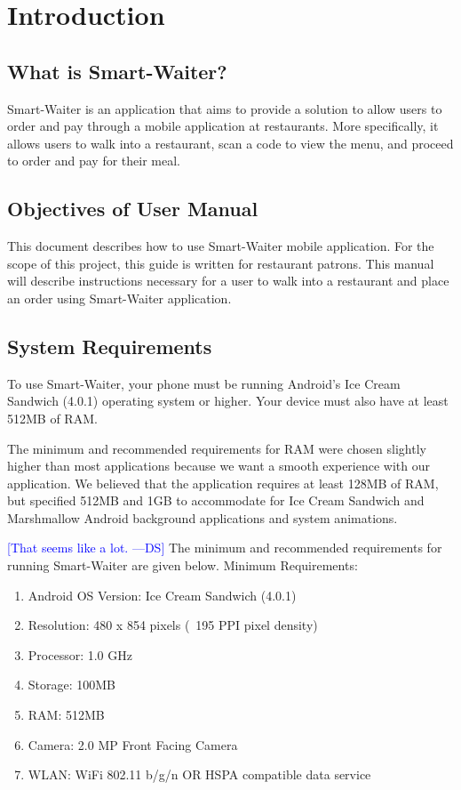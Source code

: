 \documentclass[12pt, titlepage]{article}
\newcommand{\authornote}[3]{\textcolor{#1}{[#3 ---#2]}}
\newcommand{\authornote}[3]{}
\newcommand{\ds}[1]{\authornote{blue}{DS}{#1}}
\begin{document}
\section{Introduction}

\subsection{What is Smart-Waiter?}
Smart-Waiter is an application that aims to provide a solution to allow users to order and pay through a mobile application at restaurants. More specifically, it allows users to walk into a restaurant, scan a code to view the menu, and proceed to order and pay for their meal.
\subsection{Objectives of User Manual}
This document describes how to use Smart-Waiter mobile application. For the scope of this project, this guide is written for restaurant patrons. This manual will describe instructions necessary for a user to walk into a restaurant and place an order using Smart-Waiter application. 

\subsection{System Requirements}
To use Smart-Waiter, your phone must be running Android's Ice Cream Sandwich (4.0.1) operating system or higher. Your device must also have at least 512MB of RAM. 

The minimum and recommended requirements for RAM were chosen slightly higher than most applications because we want a smooth experience with our application. We believed that the application requires at least 128MB of RAM, but specified 512MB and 1GB to accommodate for Ice Cream Sandwich and Marshmallow Android background applications and system animations.

\ds{That seems like a lot.}
The minimum and recommended requirements for running Smart-Waiter are given below.
Minimum Requirements:
\begin{enumerate}
	\item Android OS Version: Ice Cream Sandwich (4.0.1)
	\item Resolution: 480 x 854 pixels (~195 PPI pixel density)
	\item Processor: 1.0 GHz
	\item Storage: 100MB
	\item RAM: 512MB
	\item Camera: 2.0 MP Front Facing Camera
	\item WLAN: WiFi 802.11 b/g/n OR HSPA compatible data service
\end{enumerate}
\end{document}
